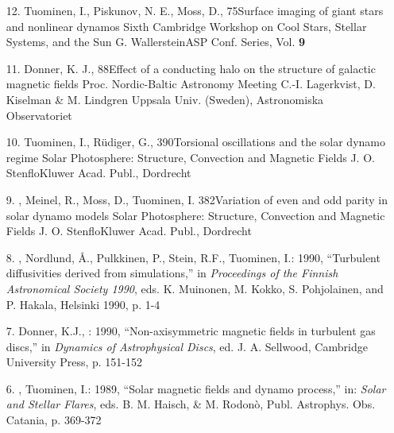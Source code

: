 \begin{itemize}
\item[12.]
Tuominen, I., Piskunov, N. E., Moss, D., \Brandenburg{}
{75}{Surface imaging of giant stars and nonlinear dynamos}
{Sixth Cambridge Workshop on Cool Stars, Stellar Systems, and the Sun}
{G. Wallerstein}{ASP Conf. Series, Vol. {\bf 9}}
  
\item[11.]
Donner, K. J., \Brandenburg{}
{88}{Effect of a conducting halo on the structure of galactic magnetic fields}
{Proc. Nordic-Baltic Astronomy Meeting}
{C.-I. Lagerkvist, D. Kiselman \& M. Lindgren}
{Uppsala Univ. (Sweden), Astronomiska Observatoriet}
 
\item[10.]
Tuominen, I., R\"udiger, G., \Brandenburg{}
{390}{Torsional oscillations and the solar dynamo regime}
{Solar Photosphere: Structure, Convection and Magnetic Fields} 
{J. O. Stenflo}{Kluwer Acad. Publ., Dordrecht}
 
\item[9.]
\Brandenburg, Meinel, R., Moss, D., Tuominen, I.
{382}{Variation of even and odd parity in solar dynamo models}
{Solar Photosphere: Structure, Convection and Magnetic Fields}  
{J. O. Stenflo}{Kluwer Acad. Publ., Dordrecht}
 
\item[8.]
\Brandenburg, Nordlund, \AA., Pulkkinen, P.,
Stein, R.F., Tuominen, I.: 1990,
``Turbulent diffusivities derived from simulations,''
in {\em Proceedings of the Finnish Astronomical Society 1990},
eds. K. Muinonen, M. Kokko, S. Pohjolainen, and P. Hakala, 
Helsinki 1990, p. 1-4

\item[7.]
Donner, K.J., \Brandenburg: 1990,
``Non-axisymmetric magnetic fields in turbulent gas discs,''
in {\em Dynamics of Astrophysical Discs},
ed. J. A. Sellwood, Cambridge University Press, p. 151-152

\item[6.]
\Brandenburg, Tuominen, I.: 1989, ``Solar magnetic fields and dynamo 
process,'' in: {\em Solar and Stellar Flares}, 
eds. B. M. Haisch, \& M. Rodon\`o, Publ. Astrophys. Obs. Catania, p. 369-372


\end{itemize}
